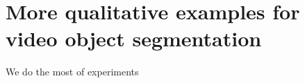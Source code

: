 \documentclass{article}
\begin{document}


\section{More qualitative examples for video object segmentation}
We do the most of experiments
\end{document}
